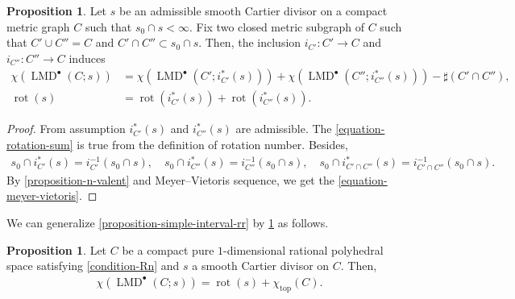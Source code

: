 \documentclass[a4paper,dvipdfmx,reqno,12pt]{amsart}
\theoremstyle{definition}
\newtheorem{proposition}[theorem]{Proposition}
\newcommand{\opn}[1]{\operatorname{#1}}
\numberwithin{equation}{section}
\begin{document}
\begin{proposition}
\label{proposition-gluing-formula}
Let $s$ be an admissible smooth Cartier divisor on a
compact metric graph $C$ such that $s_0\cap s<\infty$.
Fix two closed metric subgraph of $C$ such that
$C' \cup C''=C$ and $C'\cap C''\subset s_0 \cap s$.
Then, 
the inclusion $i_{C'}\colon C'\to C$ 
and $i_{C''}\colon C''\to C$ induces
\begin{align}
\label{equation-meyer-vietoris}
\chi(\opn{LMD}^{\bullet}(C;s))
&=\chi(\opn{LMD}^{\bullet}(C';i_{C'}^{*}(s)))
+\chi(\opn{LMD}^{\bullet}(C'';i_{C''}^{*}(s)))
-\sharp(C'\cap C''), \\
\label{equation-rotation-sum}
\opn{rot}(s)&=\opn{rot}(i_{C'}^{*}(s))
+\opn{rot}(i_{C''}^{*}(s)).
\end{align}
\end{proposition}
\begin{proof}
From assumption $i^{*}_{C'}(s)$ and 
$i^{*}_{C''}(s)$ are admissible.
The \cref{equation-rotation-sum} is true from
the definition of rotation number. 
 Besides,
\begin{align}
s_0\cap i^{*}_{C'}(s)=i^{-1}_{C'}(s_0\cap s), \quad 
s_0\cap i^{*}_{C''}(s)=i^{-1}_{C''}(s_0\cap s), \quad
s_0\cap i^{*}_{C'\cap C''}(s)=
i^{-1}_{C'\cap C''}(s_0\cap s).
\end{align}
By \cref{proposition-n-valent} 
and Meyer--Vietoris sequence, we get 
the \cref{equation-meyer-vietoris}.
\end{proof}

We can generalize
\cref{proposition-simple-interval-rr} by
\cref{proposition-gluing-formula} as follows.

\begin{proposition}
\label{proposition-MRR-1-dim-poly-space}
Let $C$ be a compact pure $1$-dimensional rational 
polyhedral space satisfying \cref{condition-Rn} 
and $s$ a smooth Cartier divisor on $C$. Then,
\begin{align}
\chi(\opn{LMD}^{\bullet}(C;s))=\opn{rot}(s)+
\chi_{\opn{top}}(C).
\end{align}
\end{proposition}
\end{document}
